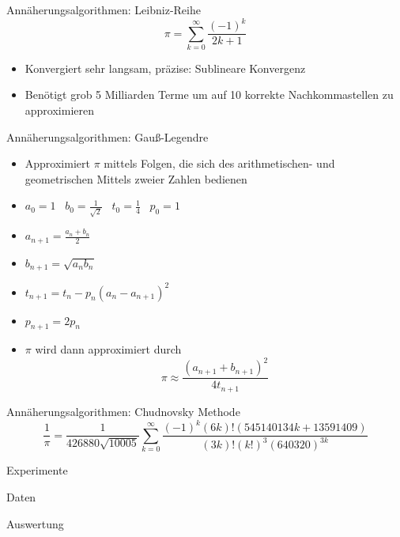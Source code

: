 \documentclass{beamer}
\begin{document}
\begin{frame}{Annäherungsalgorithmen: Leibniz-Reihe}                                                                                                        %
    \[ \pi = \sum_{k=0}^{\infty} \frac{(-1)^k}{2k+1} \]                                                                                                     %
    \begin{itemize}
        \item<2-> Konvergiert sehr langsam, präzise: Sublineare Konvergenz \\
        \item<2-> Benötigt grob 5 Milliarden Terme um auf 10 korrekte Nachkommastellen zu approximieren
    \end{itemize}
\end{frame}



\begin{frame}{Annäherungsalgorithmen: Gauß-Legendre}                                                                                                        %
    \begin{itemize}                                                                                                                                         %
        \item<1-> Approximiert \(\pi\) mittels Folgen, die sich des arithmetischen- und geometrischen Mittels zweier Zahlen bedienen
        \item<2-> \( a_0 = 1 \;\;\; b_0 = \frac{1}{\sqrt{2}} \;\;\; t_0 = \frac{1}{4} \;\;\; p_0 = 1 \)
        \item<3-> \( a_{n+1} = \frac{a_n + b_n}{2} \)
        \item<4-> \( b_{n+1} = \sqrt{a_nb_n} \)
        \item<5-> \( t_{n+1} = t_n - p_n(a_n - a_{n+1})^2 \)
        \item<6-> \( p_{n+1} = 2p_n \)
        \item<7-> \(\pi\) wird dann approximiert durch \[ \pi \approx \frac{(a_{n+1} + b_{n+1})^2}{4t_{n+1}} \]
    \end{itemize}   
\end{frame}



\begin{frame}{Annäherungsalgorithmen: Chudnovsky Methode}                                                                                                   %
    \[ \frac{1}{\pi} = \frac{1}{426880\sqrt{10005}}\sum_{k=0}^{\infty} \frac{(-1)^{k}(6k)!(545140134k + 13591409)}{(3k)!(k!)^{3}{(640320)}^{3k}} \]
\end{frame}

\begin{frame}{Experimente}  
\end{frame}


\begin{frame}{Daten}

\end{frame}



\begin{frame}{Auswertung}

\end{frame}
\end{document}
